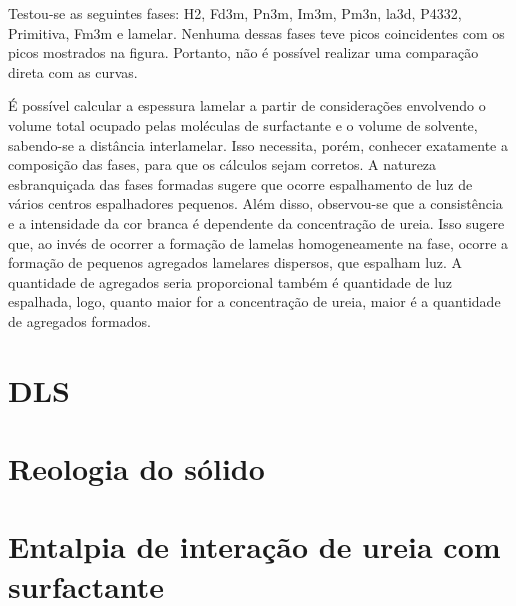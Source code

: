 	Testou-se as seguintes fases: H2, Fd3m, Pn3m, Im3m, Pm3n, la3d, P4332, Primitiva, Fm3m e lamelar. Nenhuma dessas fases teve picos coincidentes com os picos mostrados na figura. Portanto, não é possível realizar uma comparação direta com as curvas.
	
	É possível calcular a espessura lamelar a partir de considerações envolvendo o volume total ocupado pelas moléculas de surfactante e o volume de solvente, sabendo-se a distância interlamelar. Isso necessita, porém, conhecer exatamente a composição das fases, para que os cálculos sejam corretos. A natureza esbranquiçada das fases formadas sugere que ocorre espalhamento de luz de vários centros espalhadores pequenos. Além disso, observou-se que a consistência e a intensidade da cor branca é dependente da concentração de ureia. Isso sugere que, ao invés de ocorrer a formação de lamelas homogeneamente na fase, ocorre a formação de pequenos agregados lamelares dispersos, que espalham luz. A quantidade de agregados seria proporcional também é quantidade de luz espalhada, logo, quanto maior for a concentração de ureia, maior é a quantidade de agregados formados. 
\section{DLS}
\label{sec:Ureia-DLS}
\section{Reologia do sólido}
\section{Entalpia de interação de ureia com surfactante}
